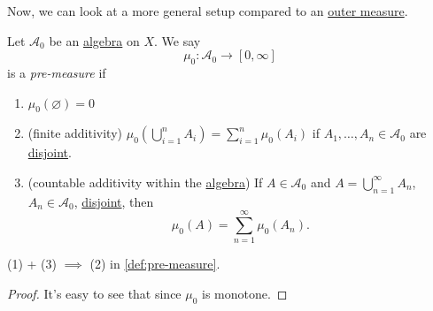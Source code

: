 \par Now, we can look at a more general setup compared to an \hyperref[def:outer-measure]{outer measure}.
\begin{definition}\label{def:pre-measure}
	Let \(\mathcal{A} _0\) be an \hyperref[def:algebra]{algebra} on \(X\). We say
	\[
		\mu_0 \colon \mathcal{A} _0\to [0, \infty ]
	\]
	is a \emph{pre-measure} if
	\begin{enumerate}
		\item\label{def:pre-measure-empty-measure}\(\mu_0(\varnothing ) = 0\)
		\item\label{def:pre-measure-finite-additivity}(finite additivity) \(\mu_0\left(\bigcup\limits_{i=1}^{n} A_{i}\right) = \sum\limits_{i=1}^{n} \mu_0(A_{i})\) if
		\(A_1, \ldots , A_n\in \mathcal{A} _0 \) are \underline{disjoint}.
		\item\label{def:pre-measure-countable-additivity-within-the-algebra}(countable additivity within the \hyperref[def:algebra]{algebra}) If \(A\in\mathcal{A} _0\) and \(A = \bigcup\limits_{n=1}^{\infty} A_{n}\),
		\(A_n\in\mathcal{A} _0\), \underline{disjoint}, then
		\[
			\mu_0(A) = \sum\limits_{n=1}^{\infty} \mu_0(A_{n}).
		\]
	\end{enumerate}
\end{definition}

\begin{lemma}
	(1) + (3) \(\implies \) (2) in \autoref{def:pre-measure}.
\end{lemma}
\begin{proof}
	It's easy to see that since \(\mu _0\) is monotone.
\end{proof}

